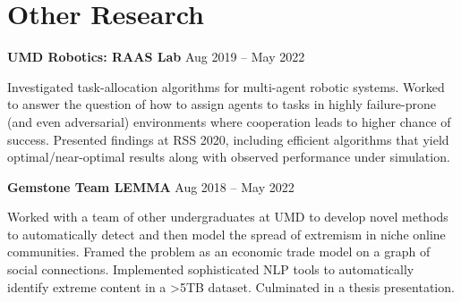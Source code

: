 \documentclass[letterpaper,11pt]{article}
\begin{document}
\section{Other Research}
\hspace{8pt}
\begin{minipage}[t]{0.46\textwidth}
    \textbf{UMD Robotics: RAAS Lab} \hspace{\fill} Aug 2019 -- May 2022
    
    \setlength{\parindent}{15pt}
    {\small Investigated task-allocation algorithms for multi-agent robotic systems. Worked to answer the question of how to assign agents to tasks in highly failure-prone (and even adversarial) environments where cooperation leads to higher chance of success. Presented findings at RSS 2020, including efficient algorithms that yield optimal/near-optimal results along with observed performance under simulation.}
\end{minipage}
\hfill
\begin{minipage}[t]{0.46\textwidth}
    \textbf{Gemstone Team LEMMA} \hspace{\fill} Aug 2018 -- May 2022
    
    \setlength{\parindent}{15pt}
    {\small Worked with a team of other undergraduates at UMD to develop novel methods to automatically detect and then model the spread of extremism in niche online communities. Framed the problem as an economic trade model on a graph of social connections. Implemented sophisticated NLP tools to automatically identify extreme content in a >5TB dataset. Culminated in a thesis presentation.}
\end{minipage}
\hspace{8pt}
\end{document}
